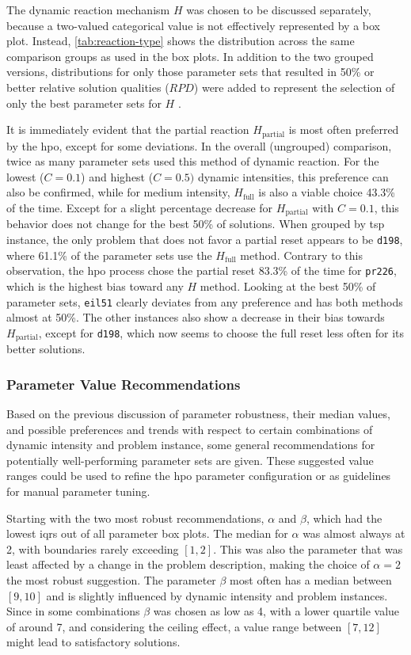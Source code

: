 The dynamic reaction mechanism $H$ was chosen to be discussed separately, because a two-valued categorical value is not effectively represented by a box plot. Instead, \cref{tab:reaction-type} shows the distribution across the same comparison groups as used in the box plots. In addition to the two grouped versions, distributions for only those parameter sets that resulted in 50\% or better relative solution qualities ($RPD$) were added to represent the selection of only the best parameter sets for $H$ .

It is immediately evident that the partial reaction $H_\text{partial}$ is most often preferred by the \glsdesc{hpo}, except for some deviations. In the overall (ungrouped) comparison, twice as many parameter sets used this method of dynamic reaction. For the lowest ($C=0.1$) and highest ($C=0.5)$ dynamic intensities, this preference can also be confirmed, while for medium intensity, $H_\text{full}$ is also a viable choice 43.3\% of the time. Except for a slight percentage decrease for $H_\text{partial}$ with $C=0.1$, this behavior does not change for the best 50\% of solutions.
When grouped by \gls{tsp} instance, the only problem that does not favor a partial reset appears to be \texttt{d198}, where 61.1\% of the parameter sets use the $H_\text{full}$ method. Contrary to this observation, the \gls{hpo} process chose the partial reset 83.3\% of the time for \texttt{pr226}, which is the highest bias toward any $H$ method. Looking at the best 50\% of parameter sets, \texttt{eil51} clearly deviates from any preference and has both methods almost at 50\%. The other instances also show a decrease in their bias towards $H_\text{partial}$, except for \texttt{d198}, which now seems to choose the full reset less often for its better solutions.

\subsubsection{Parameter Value Recommendations}

Based on the previous discussion of parameter robustness, their median values, and possible preferences and trends with respect to certain combinations of dynamic intensity and problem instance, some general recommendations for potentially well-performing parameter sets are given. These suggested value ranges could be used to refine the \gls{hpo} parameter configuration or as guidelines for manual parameter tuning.

Starting with the two most robust recommendations, $\alpha$ and $\beta$, which had the lowest \glspl{iqr} out of all parameter box plots. The median for $\alpha$ was almost always at 2, with boundaries rarely exceeding $[1,2]$. This was also the parameter that was least affected by a change in the problem description, making the choice of $\alpha = 2$ the most robust suggestion. The parameter $\beta$ most often has a median between $[9,10]$ and is slightly influenced by dynamic intensity and problem instances. Since in some combinations $\beta$ was chosen as low as 4, with a lower quartile value of around 7, and considering the ceiling effect, a value range between $[7,12]$ might lead to satisfactory solutions.

